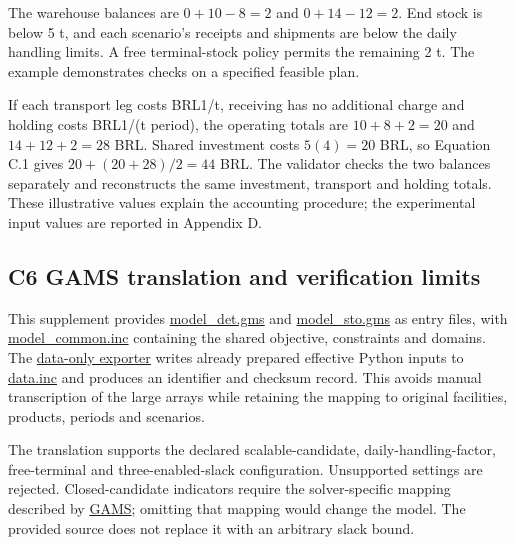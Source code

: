 \documentclass[
  english,
  11pt,
  a4paper,
]{article}
\begin{document}
The warehouse balances are \(0+10-8=2\) and \(0+14-12=2\). End stock is
below 5 t, and each scenario's receipts and shipments are below the
daily handling limits. A free terminal-stock policy permits the
remaining 2 t. The example demonstrates checks on a specified feasible
plan.

If each transport leg costs BRL1/t, receiving has no additional charge
and holding costs BRL1/(t period), the operating totals are
\(10+8+2=20\) and \(14+12+2=28\) BRL. Shared investment costs
\(5(4)=20\) BRL, so Equation C.1 gives \(20+(20+28)/2=44\) BRL. The
validator checks the two balances separately and reconstructs the same
investment, transport and holding totals. These illustrative values
explain the accounting procedure; the experimental input values are
reported in Appendix D.

\subsection{C6 GAMS translation and verification
limits}\label{c6-gams-translation-and-verification-limits}

This supplement provides \href{https://github.com/unb-lamfo-or-ai-hpc/model-agrologistic/blob/main/manuscript/supplement/appendix_c/model_det.gms}{model\_det.gms} and \href{https://github.com/unb-lamfo-or-ai-hpc/model-agrologistic/blob/main/manuscript/supplement/appendix_c/model_sto.gms}{model\_sto.gms} as entry
files, with \href{https://github.com/unb-lamfo-or-ai-hpc/model-agrologistic/blob/main/manuscript/supplement/appendix_c/model_common.inc}{model\_common.inc} containing the shared objective,
constraints and domains.
The \href{https://github.com/unb-lamfo-or-ai-hpc/model-agrologistic/blob/main/scripts/export_scalar_gams_data.py}{data-only exporter} writes already prepared
effective Python inputs to \href{https://github.com/unb-lamfo-or-ai-hpc/model-agrologistic/blob/main/manuscript/supplement/appendix_c/README.md}{data.inc} and produces an identifier and checksum record. This avoids manual transcription of the large arrays
while retaining the mapping to original facilities, products, periods
and scenarios.

The translation supports the declared scalable-candidate,
daily-handling-factor, free-terminal and three-enabled-slack
configuration. Unsupported settings are rejected. Closed-candidate
indicators require the solver-specific mapping described by
\href{https://www.gams.com/latest/docs/UG_LanguageFeatures.html\#UG_LanguageFeatures_IndicatorConstraints}{GAMS};
omitting that mapping would change the model. The provided source does
not replace it with an arbitrary slack bound.
\end{document}
